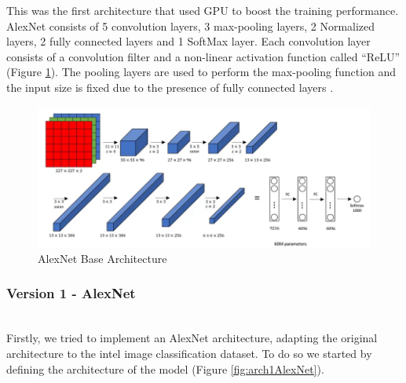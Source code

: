 \documentclass[conference]{IEEEtran}
\begin{document}
This was the first architecture that used GPU to boost the training performance. AlexNet consists of 5 convolution layers, 3 max-pooling layers, 2 Normalized layers, 2 fully connected layers and 1 SoftMax layer. Each convolution layer consists of a convolution filter and a non-linear activation function called “ReLU” (Figure \ref{fig:archAlexNet}). The pooling layers are used to perform the max-pooling function and the input size is fixed due to the presence of fully connected layers \cite{web:AlexNet:2022}.

\begin{figure}[H]
    \centering
    \includegraphics[width=0.9\linewidth]{images/alexnet_arch.png}
    \caption{AlexNet Base Architecture}
    \label{fig:archAlexNet}
\end{figure}

\vspace{2mm}

\subsubsection{Version 1 - AlexNet}
\hfill\\

Firstly, we tried to implement an AlexNet architecture, adapting the original architecture to the intel image classification dataset. To do so we started by defining the architecture of the model (Figure \ref{fig:arch1AlexNet}).
\end{document}
